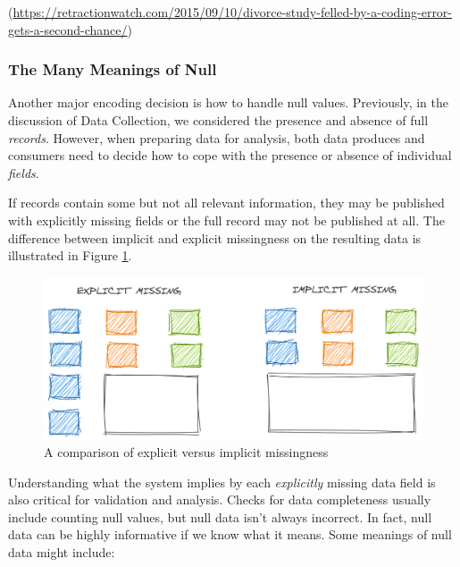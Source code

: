 \documentclass[
]{krantz}
\begin{document}
(\url{https://retractionwatch.com/2015/09/10/divorce-study-felled-by-a-coding-error-gets-a-second-chance/})

\hypertarget{the-many-meanings-of-null}{%
\subsubsection{The Many Meanings of Null}\label{the-many-meanings-of-null}}

Another major encoding decision is how to handle null values.
Previously, in the discussion of Data Collection, we considered the presence and absence of full \emph{records}.
However, when preparing data for analysis, both data produces and consumers need to decide how to cope with the presence or absence of individual \emph{fields}.

If records contain some but not all relevant information, they may be published with explicitly missing fields or the full record may not be published at all. The difference between implicit and explicit missingness on the resulting data is illustrated in Figure \ref{fig:null-impl-expl}.

\begin{figure}

{\centering \includegraphics[width=0.9\linewidth]{figures/data-dall/missing-imp-exp} 

}

\caption{A comparison of explicit versus implicit missingness}\label{fig:null-impl-expl}
\end{figure}

Understanding what the system implies by each \emph{explicitly} missing data field is also critical for validation and analysis.
Checks for data completeness usually include counting null values, but null data isn't always incorrect.
In fact, null data can be highly informative if we know what it means. Some meanings of null data might include:
\end{document}

